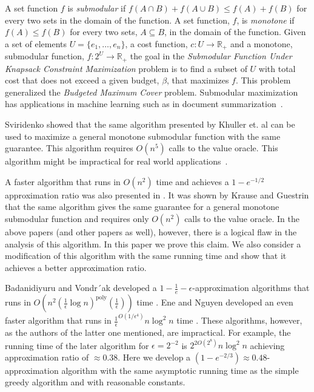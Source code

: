 A set function $f$ is \emph{submodular} if $f(A \cap B) + f(A \cup B) \leq f(A) + f(B)$
for every two sets in the domain of the function. A set function, $f$, 
is \emph{monotone} if
$f(A) \leq f(B)$ for every two sets, $A \subseteq B$, in the domain of the function.
Given a set of elements $U = \{e_1, \dots, e_n\}$, a cost function,
$c:U \to \mathbb{R}_+$ and a monotone, submodular function, $f:2^U \to \mathbb{R}_+$
the goal in the 
\emph{Submodular Function Under Knapsack Constraint Maximization} 
problem is to find a subset of $U$ with total cost that does not exceed
a given budget, $\beta$, that maximizes $f$.
This problem generalized the \emph{Budgeted Maximum Cover} problem.
Submodular maximization has applications in machine learning such as in document summarization~\cite{lin2010multi}.

Sviridenko \cite{sviridenko2004note} showed that the same algorithm presented by
Khuller et. al can be used to maximize a general monotone submodular function
with the same guarantee.
This algorithm requires $O(n^5)$ calls to the value oracle.
This algorithm might be impractical for real world applications~\cite{lin2010multi}.

A faster algorithm that runs in $O(n^2)$ time and achieves a $1 - e^{-1/2}$ approximation ratio
was also presented in \cite{khuller1999budgeted}.
It was shown by Krause and Guestrin \cite{krause2005note} that the same algorithm
gives the same guarantee for a general monotone submodular function and requires only
$O(n^2)$ calls to the value oracle.
In the above papers (and other papers as well), however,
there is a logical flaw in the analysis of this algorithm.
In this paper we prove this claim.
We also consider a modification of this algorithm with the same running time and show that it
achieves a better approximation ratio.

Badanidiyuru and Vondr´ak developed a $1 - \frac{1}{e} - \epsilon$-approximation 
algorithms that runs in 
$O(n^2(\frac{1}{\epsilon}\log n)^\text{poly}(\frac{1}{\epsilon}))$ time 
\cite{badanidiyuru2014fast}.
Ene and Nguyen developed an even faster algorithm that runs in 
$\frac{1}{\epsilon}^{O(1/\epsilon^4)}n \log^2 n$ time
\cite{Alina2017}.
These algorithms, however, 
as the authors of the latter one mentioned, are impractical.
For example, the running time of the later algorithm for $\epsilon = 2^{-2}$ is
$2^{2O(2^{8})}n\log^2n$ achieving approximation ratio of $\approx 0.38$.
Here we develop a $(1 - e^{-2/3}) \approx 0.48$-approximation algorithm with the same
asymptotic running time as the simple greedy algorithm and with reasonable constants.

